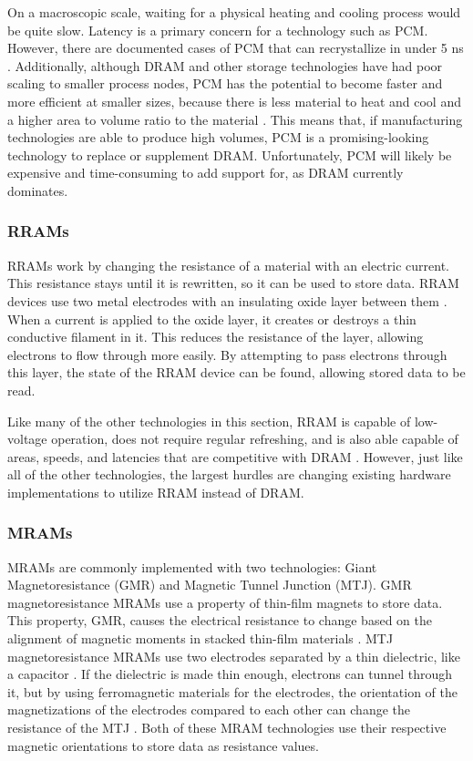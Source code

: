 \documentclass[doublespace,nopageskip]{VTthesis}
\begin{document}
On a macroscopic scale, waiting for a physical heating and cooling process would be quite slow. Latency is a primary concern for a technology such as PCM. However, there are documented cases of PCM that can recrystallize in under 5 ns \cite{fastswitchingpcm}. Additionally, although DRAM and other storage technologies have had poor scaling to smaller process nodes, PCM has the potential to become faster and more efficient at smaller sizes, because there is less material to heat and cool and a higher area to volume ratio to the material \cite{fastswitchingpcm}. This means that, if manufacturing technologies are able to produce high volumes, PCM is a promising-looking technology to replace or supplement DRAM. Unfortunately, PCM will likely be expensive and time-consuming to add support for, as DRAM currently dominates.

\subsubsection{RRAMs}\label{sss:rrams}
RRAMs work by changing the resistance of a material with an electric current. This resistance stays until it is rewritten, so it can be used to store data. RRAM devices use two metal electrodes with an insulating oxide layer between them \cite{rramoverview}. When a current is applied to the oxide layer, it creates or destroys a thin conductive filament in it. This reduces the resistance of the layer, allowing electrons to flow through more easily. By attempting to pass electrons through this layer, the state of the RRAM device can be found, allowing stored data to be read.

Like many of the other technologies in this section, RRAM is capable of low-voltage operation, does not require regular refreshing, and is also able capable of areas, speeds, and latencies that are competitive with DRAM \cite{rram}. However, just like all of the other technologies, the largest hurdles are changing existing hardware implementations to utilize RRAM instead of DRAM.

\subsubsection{MRAMs}\label{sss:mrams}
MRAMs are commonly implemented with two technologies: Giant Magnetoresistance (GMR) and Magnetic Tunnel Junction (MTJ). GMR magnetoresistance MRAMs use a property of thin-film magnets to store data. This property, GMR, causes the electrical resistance to change based on the alignment of magnetic moments in stacked thin-film materials \cite{gmrphysics}. MTJ magnetoresistance MRAMs use two electrodes separated by a thin dielectric, like a capacitor \cite{gmrphysics}. If the dielectric is made thin enough, electrons can tunnel through it, but by using ferromagnetic materials for the electrodes, the orientation of the magnetizations of the electrodes compared to each other can change the resistance of the MTJ \cite{gmrphysics}. Both of these MRAM technologies use their respective magnetic orientations to store data as resistance values.
\end{document}
